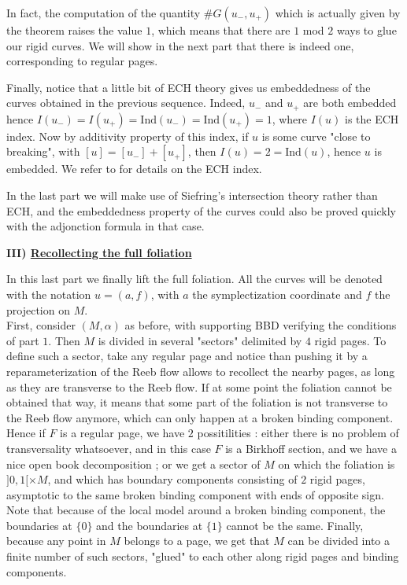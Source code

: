 \documentclass[../main.tex]{subfiles}
\begin{document}
\begin{remark}
    In fact, the computation of the quantity $\#G(u_-,u_+)$ which is actually given by the theorem raises the value $1$, which means that there are $1$ mod $2$ ways to glue our rigid curves. We will show in the next part that there is indeed one, corresponding to regular pages.
\end{remark}

                
Finally, notice that a little bit of ECH theory gives us embeddedness of the curves obtained in the previous sequence. Indeed, $u_-$ and $u_+$ are both embedded  hence $I(u_-) = I(u_+) = \text{Ind}(u_-) = \text{Ind}(u_+) = 1$, where $I(u)$ is the ECH index. Now by additivity property of this index, if $u$ is some curve "close to breaking", with $[u] = [u_-] + [u_+]$, then $I(u) = 2 = \text{Ind}(u)$, hence $u$ is embedded. We refer to \cite{hutchings_lecture_2014} for details on the ECH index.

\begin{remark}
    In the last part we will make use of Siefring's intersection theory rather than ECH, and the embeddedness property of the curves could also be proved quickly with the adjonction formula in that case.
\end{remark}
 

\textbf{III) \underline{Recollecting the full foliation}}
\newline

In this last part we finally lift the full foliation. All the curves will be denoted with the notation $u = (a,f)$, with $a$ the symplectization coordinate and $f$ the projection on $M$.\\

First, consider $(M,\alpha)$ as before, with supporting BBD verifying the conditions of part $1$. Then $M$ is divided in several "sectors" delimited by $4$ rigid pages. To define such a sector, take any regular page and notice than pushing it by a reparameterization of the Reeb flow allows to recollect the nearby pages, as long as they are transverse to the Reeb flow. If at some point the foliation cannot be obtained that way, it means that some part of the foliation is not transverse to the Reeb flow anymore, which can only happen at a broken binding component. Hence if $F$ is a regular page, we have $2$ possitilities : either there is no problem of transversality whatsoever, and in this case $F$ is a Birkhoff section, and we have a nice open book decomposition ; or we get a sector of $M$ on which the foliation is $]0,1[\times M$, and which has boundary components consisting of $2$ rigid pages, asymptotic to the same broken binding component with ends of opposite sign. Note that because of the local model around a broken binding component, the boundaries at $\{0\}$ and the boundaries at $\{1\}$ cannot be the same. Finally, because any point in $M$ belongs to a page, we get that $M$ can be divided into a finite number of such sectors, "glued" to each other along rigid pages and binding components.\\
\end{document}
